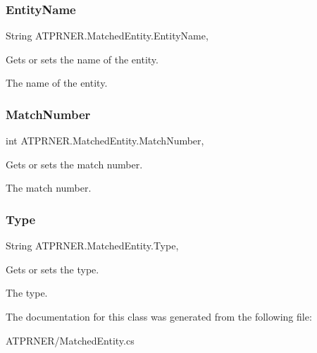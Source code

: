 \subsubsection{\texorpdfstring{Entity\+Name}{EntityName}}
{\footnotesize\ttfamily String A\+T\+P\+R\+N\+E\+R.\+Matched\+Entity.\+Entity\+Name\hspace{0.3cm}{\ttfamily [get]}, {\ttfamily [set]}}



Gets or sets the name of the entity. 

The name of the entity.\hypertarget{class_a_t_p_r_n_e_r_1_1_matched_entity_ad6ca936e2b54158984f7d7d3753d1490}{}\label{class_a_t_p_r_n_e_r_1_1_matched_entity_ad6ca936e2b54158984f7d7d3753d1490} 
\subsubsection{\texorpdfstring{Match\+Number}{MatchNumber}}
{\footnotesize\ttfamily int A\+T\+P\+R\+N\+E\+R.\+Matched\+Entity.\+Match\+Number\hspace{0.3cm}{\ttfamily [get]}, {\ttfamily [set]}}



Gets or sets the match number. 

The match number.\hypertarget{class_a_t_p_r_n_e_r_1_1_matched_entity_af7d651ec944931f14c26eedffc4150de}{}\label{class_a_t_p_r_n_e_r_1_1_matched_entity_af7d651ec944931f14c26eedffc4150de} 
\subsubsection{\texorpdfstring{Type}{Type}}
{\footnotesize\ttfamily String A\+T\+P\+R\+N\+E\+R.\+Matched\+Entity.\+Type\hspace{0.3cm}{\ttfamily [get]}, {\ttfamily [set]}}



Gets or sets the type. 

The type.

The documentation for this class was generated from the following file\+:\begin{DoxyCompactItemize}
\item 
A\+T\+P\+R\+N\+E\+R/Matched\+Entity.\+cs\end{DoxyCompactItemize}

